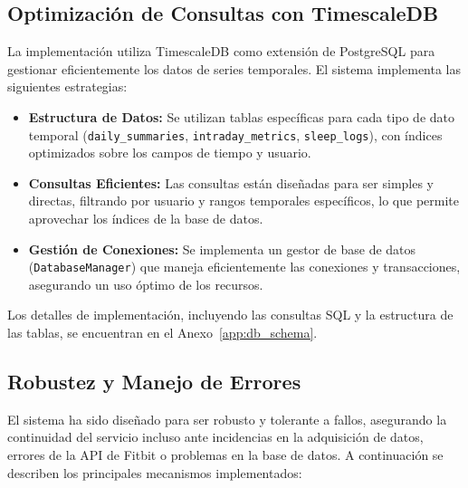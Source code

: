 \subsection{Optimización de Consultas con TimescaleDB}
\label{subsec:impl_timescaledb_optimization}

La implementación utiliza TimescaleDB como extensión de PostgreSQL para gestionar eficientemente los datos de series temporales. El sistema implementa las siguientes estrategias:

\begin{itemize}
    \item \textbf{Estructura de Datos:} Se utilizan tablas específicas para cada tipo de dato temporal (\texttt{daily\_summaries}, \texttt{intraday\_metrics}, \texttt{sleep\_logs}), con índices optimizados sobre los campos de tiempo y usuario.
    \item \textbf{Consultas Eficientes:} Las consultas están diseñadas para ser simples y directas, filtrando por usuario y rangos temporales específicos, lo que permite aprovechar los índices de la base de datos.
    \item \textbf{Gestión de Conexiones:} Se implementa un gestor de base de datos (\texttt{DatabaseManager}) que maneja eficientemente las conexiones y transacciones, asegurando un uso óptimo de los recursos.
\end{itemize}

Los detalles de implementación, incluyendo las consultas SQL y la estructura de las tablas, se encuentran en el Anexo~\ref{app:db_schema}. 

\subsection{Robustez y Manejo de Errores}
\label{subsec:robustez_errores}

El sistema ha sido diseñado para ser robusto y tolerante a fallos, asegurando la continuidad del servicio incluso ante incidencias en la adquisición de datos, errores de la API de Fitbit o problemas en la base de datos. A continuación se describen los principales mecanismos implementados:


